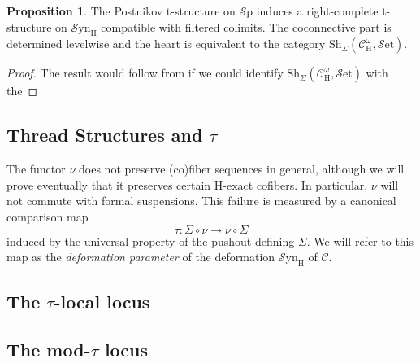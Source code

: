 \documentclass[10pt]{amsart}
\theoremstyle{definition}
\numberwithin{figure}{section}
\numberwithin{equation}{section}
\newtheorem{proposition}[figure]{Proposition}
\newcommand{\cC}{\mathcal{C}}
\theoremstyle{cited}
\newcommand{\Sp}{{\mathcal{S}\mathrm{p}}}
\newcommand{\Set}{{\mathcal{S}\mathrm{et}}}
\newcommand{\Sh}{\mathrm{Sh}}
\newcommand{\Syn}{\mathcal{S}\mathrm{yn}}
\renewcommand{\H}{\mathrm{H}}
\begin{document}
\begin{proposition}
  The Postnikov t-structure on $\Sp$ induces a right-complete t-structure on $\Syn_{\H}$ compatible with filtered colimits. The coconnective part is determined levelwise and the heart is equivalent to the category $\Sh_{\Sigma}(\cC_{\H}^\omega, \Set)$.
\end{proposition}

\begin{proof}
  The result would follow from \cite[Proposition 2.16]{Pst22} if we could identify $\Sh_{\Sigma}(\cC_{\H}^\omega, \Set)$ with the 
\end{proof}



\subsection{Thread Structures and $\tau$}



The functor $\nu$ does not preserve (co)fiber sequences in general, although we will prove eventually that it preserves certain $\H$-exact cofibers. In particular, $\nu$ will not commute with formal suspensions. This failure is measured by a canonical comparison map
\[
\tau: \Sigma \circ \nu \to \nu \circ \Sigma
\]
induced by the universal property of the pushout defining $\Sigma$. We will refer to this map as the \textit{deformation parameter} of the deformation $\Syn_\H$ of $\cC$. 

\subsection{The $\tau$-local locus}

\subsection{The mod-$\tau$ locus}
\end{document}
